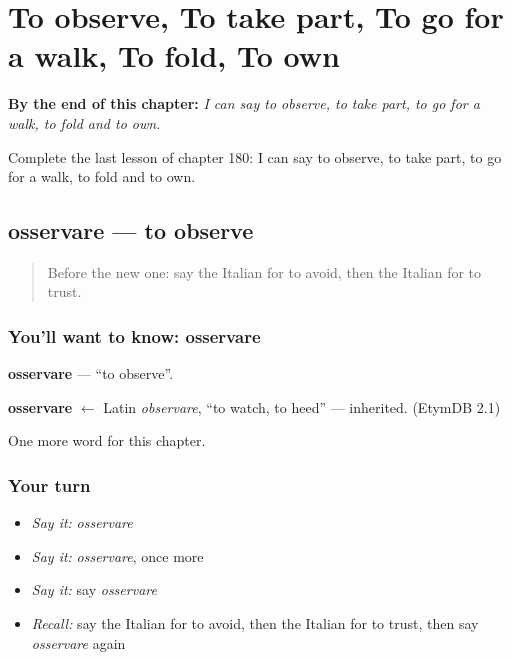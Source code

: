 
\chapter{To observe, To take part, To go for a walk, To fold, To own}
\label{ch:it-to-observe-to-take-part-to-go-for-a-walk-to-fold-to-own}

\begin{chapteropening}
\textbf{By the end of this chapter:} \emph{I can say to observe, to take part, to go for a walk, to fold and to own.}

Complete the last lesson of chapter 180: I can say to observe, to take part, to go for a walk, to fold and to own.
\end{chapteropening}

\section[osservare]{osservare — to observe}

\label{lesson:IT-C180-osservare}



\begin{quote}
Before the new one: say the Italian for to avoid, then the Italian for to trust.
\end{quote}

\subsection*{You'll want to know: osservare}
\textbf{osservare} — \textquotedblleft{}to observe\textquotedblright{}.

\begin{cousinweb}
\textbf{osservare} $\leftarrow$ Latin \emph{observare}, \textquotedblleft{}to watch, to heed\textquotedblright{} — inherited. (EtymDB 2.1)
\end{cousinweb}

\begin{grammarlens}[title={What you've built}]
One more word for this chapter.
\end{grammarlens}

\subsection*{Your turn}
\begin{itemize}
\raggedright
  \item \emph{Say it:} \emph{osservare}
  \item \emph{Say it:} \emph{osservare}, once more
  \item \emph{Say it:} say \emph{osservare}
  \item \emph{Recall:} say the Italian for to avoid, then the Italian for to trust, then say \emph{osservare} again
\end{itemize}

